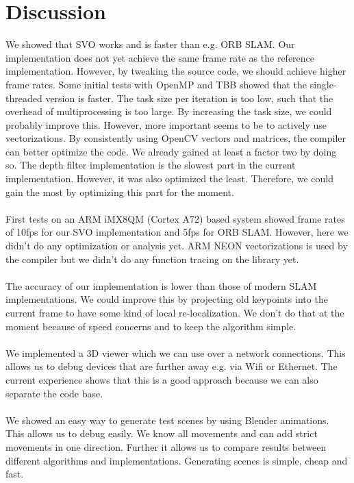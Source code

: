 \documentclass[11pt,a4paper,titlepage,oneside]{report}
\begin{document}
\chapter{Discussion}\label{ch:discussion}

We showed that SVO works and is faster than e.g. ORB SLAM. Our implementation does not yet achieve the same frame rate as the reference implementation. However, by tweaking the source code, we should achieve higher frame rates. Some initial tests with OpenMP and TBB showed that the single-threaded version is faster. The task size per iteration is too low, such that the overhead of multiprocessing is too large. By increasing the task size, we could probably improve this. However, more important seems to be to actively use vectorizations. By consistently using OpenCV vectors and matrices, the compiler can better optimize the code. We already gained at least a factor two by doing so. The depth filter implementation is the slowest part in the current implementation. However, it was also optimized the least. Therefore, we could gain the most by optimizing this part for the moment.\\\\
First tests on an ARM iMX8QM (Cortex A72) based system showed frame rates of 10fps for our SVO implementation and 5fps for ORB SLAM. However, here we didn't do any optimization or analysis yet. ARM NEON vectorizations is used by the compiler but we didn't do any function tracing on the library yet.\\\\
The accuracy of our implementation is lower than those of modern SLAM implementations. We could improve this by projecting old keypoints into the current frame to have some kind of local re-localization. We don't do that at the moment because of speed concerns and to keep the algorithm simple.\\\\
We implemented a 3D viewer which we can use over a network connections. This allows us to debug devices that are further away e.g. via Wifi or Ethernet. The current experience shows that this is a good approach because we can also separate the code base.\\\\
We showed an easy way to generate test scenes by using Blender animations. This allows us to debug easily. We know all movements and can add strict movements in one direction. Further it allows us to compare results between different algorithms and implementations. Generating scenes is simple, cheap and fast.\\\\
\end{document}
